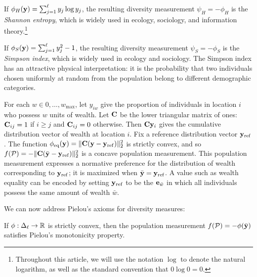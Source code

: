 \begin{example} \label{example:shannon}
  If $\phi_H(\mathbf{y}) = \sum_{j = 1}^\ell y_j \log y_j$, the resulting diversity measurement $\psi_H = -\phi_H$ is the \emph{Shannon entropy}, which is widely used in ecology, sociology, and information theory.\footnote{Throughout this article, we will use the notation $\log$ to denote the natural logarithm, as well as the standard convention that $0 \log 0 = 0$.} 
\end{example}

\begin{example} \label{example:simpson}
  If $\phi_S(\mathbf{y}) = \sum_{j = 1}^\ell y_j^2 - 1$, the resulting diversity measurement $\psi_S = -\phi_S$ is the \emph{Simpson index}, which is widely used in ecology and sociology.
  The Simpson index has an attractive physical interpretation: it is the probability that two individuals chosen uniformly at random from the population belong to different demographic categories.
\end{example}

\begin{example} \label{example:equality}
  For each $w \in 0,\ldots,w_\mathrm{max}$, let $y_{iw}$ give the proportion of individuals in location $i$ who possess $w$ units of wealth.
  Let $\mathbf{C}$ be the  lower triangular matrix of ones: $\mathbf{C}_{ij} = 1$ if $i \geq j$ and $\mathbf{C}_{ij} = 0$ otherwise. 
  Then $\mathbf{C} \mathbf{y}_i$ gives the cumulative distribution vector of wealth at location $i$. 
  Fix a reference distribution vector $\mathbf{y}_{\mathrm{ref}}$. 
  The function $\phi_{\mathrm{eq}}(\mathbf{y}) = \lVert \mathbf{C} (\mathbf{y} - \mathbf{y}_{\mathrm{ref}}) \rVert_2^2$ is strictly convex, and so $f(\mathcal{P}) = -\lVert \mathbf{C} (\bar{\mathbf{y}} - \mathbf{y}_{\mathrm{ref}}) \rVert_2^2$ is a concave population measurement.
  This population measurement expresses a normative preference for the distribution of wealth corresponding to $\mathbf{y}_{\mathrm{ref}}$; it is maximized when $\bar{\mathbf{y}} = \mathbf{y}_{\mathrm{ref}}$. 
  A value such as wealth equality can be encoded by setting $\mathbf{y}_{\mathrm{ref}}$ to be the $\mathbf{e}_{\bar{w}}$ in which all individuals possess the same amount of wealth $\bar{w}$.
\end{example}


We can now address Pielou's axioms for diversity measures: 

\begin{thm} \label{thm:monotone-under-group-addition}
  If $\phi: \Delta_{\ell} \rightarrow \mathbb{R}$ is strictly convex, then the population measurement $f(\mathcal{P}) = -\phi(\bar{\mathbf{y}})$ satisfies Pielou's monotonicity property. 
\end{thm}

